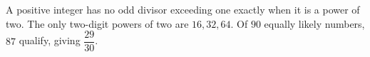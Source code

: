 A positive integer has no odd divisor exceeding one exactly when it is a power of two. The only two-digit powers of two are $16,32,64$. Of $90$ equally likely numbers, $87$ qualify, giving $\boxed{\dfrac{29}{30}}$.
